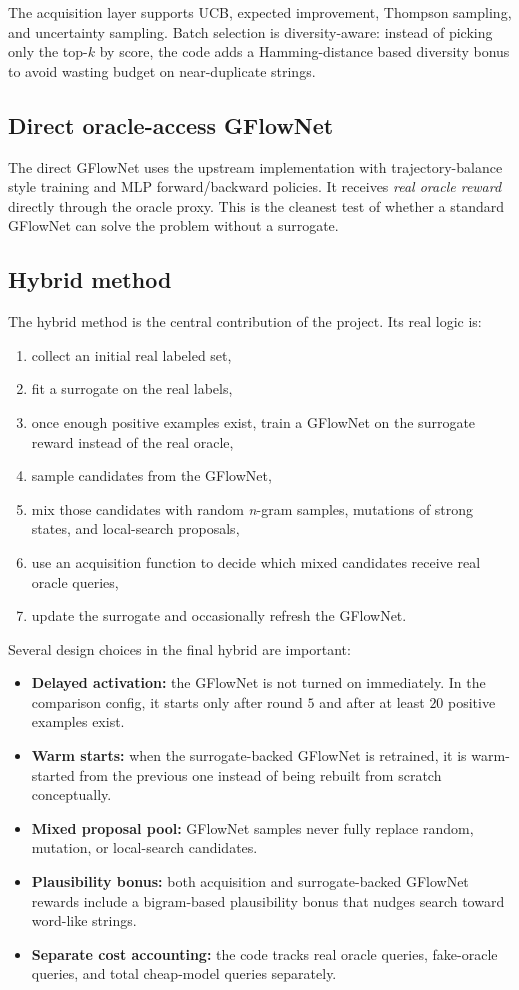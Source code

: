 \documentclass[10pt]{article}
\begin{document}
The acquisition layer supports UCB, expected improvement, Thompson sampling, and uncertainty sampling. Batch selection is diversity-aware: instead of picking only the top-\(k\) by score, the code adds a Hamming-distance based diversity bonus to avoid wasting budget on near-duplicate strings.

\subsection{Direct oracle-access GFlowNet}
The direct GFlowNet uses the upstream implementation with trajectory-balance style training and MLP forward/backward policies. It receives \emph{real oracle reward} directly through the oracle proxy. This is the cleanest test of whether a standard GFlowNet can solve the problem without a surrogate.

\subsection{Hybrid method}
The hybrid method is the central contribution of the project. Its real logic is:
\begin{enumerate}
    \item collect an initial real labeled set,
    \item fit a surrogate on the real labels,
    \item once enough positive examples exist, train a GFlowNet on the surrogate reward instead of the real oracle,
    \item sample candidates from the GFlowNet,
    \item mix those candidates with random \emph{n}-gram samples, mutations of strong states, and local-search proposals,
    \item use an acquisition function to decide which mixed candidates receive real oracle queries,
    \item update the surrogate and occasionally refresh the GFlowNet.
\end{enumerate}

Several design choices in the final hybrid are important:
\begin{itemize}
    \item \textbf{Delayed activation:} the GFlowNet is not turned on immediately. In the comparison config, it starts only after round \(5\) and after at least \(20\) positive examples exist.
    \item \textbf{Warm starts:} when the surrogate-backed GFlowNet is retrained, it is warm-started from the previous one instead of being rebuilt from scratch conceptually.
    \item \textbf{Mixed proposal pool:} GFlowNet samples never fully replace random, mutation, or local-search candidates.
    \item \textbf{Plausibility bonus:} both acquisition and surrogate-backed GFlowNet rewards include a bigram-based plausibility bonus that nudges search toward word-like strings.
    \item \textbf{Separate cost accounting:} the code tracks real oracle queries, fake-oracle queries, and total cheap-model queries separately.
\end{itemize}
\end{document}
